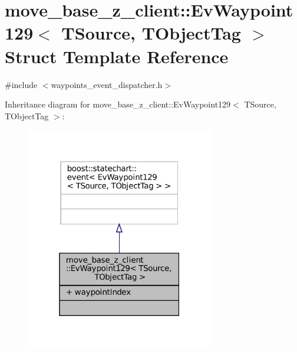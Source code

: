 \hypertarget{structmove__base__z__client_1_1EvWaypoint129}{}\section{move\+\_\+base\+\_\+z\+\_\+client\+:\+:Ev\+Waypoint129$<$ T\+Source, T\+Object\+Tag $>$ Struct Template Reference}
\label{structmove__base__z__client_1_1EvWaypoint129}


{\ttfamily \#include $<$waypoints\+\_\+event\+\_\+dispatcher.\+h$>$}



Inheritance diagram for move\+\_\+base\+\_\+z\+\_\+client\+:\+:Ev\+Waypoint129$<$ T\+Source, T\+Object\+Tag $>$\+:
\nopagebreak
\begin{figure}[H]
\begin{center}
\leavevmode
\includegraphics[width=232pt]{structmove__base__z__client_1_1EvWaypoint129__inherit__graph}
\end{center}
\end{figure}


